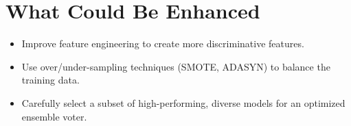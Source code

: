 \documentclass[10pt,a4paper,twocolumn,twoside]{tau-class/tau}
\begin{document}
\section{What Could Be Enhanced}
\begin{itemize}[noitemsep]
    \item Improve feature engineering to create more discriminative features.
    \item Use over/under-sampling techniques (SMOTE, ADASYN) to balance the training data.
    \item Carefully select a subset of high-performing, diverse models for an optimized ensemble voter.
\end{itemize}
\end{document}
